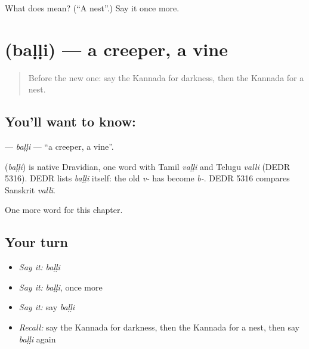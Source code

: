 \begin{tcolorbox}[breakable,colback=teal!4,colframe=teal!35!black,title={Before you move on}]
What does  mean? (\textquotedblleft{}A nest\textquotedblright{}.) Say it once more.
\end{tcolorbox}
\section[\texorpdfstring{\kn{ಬಳ್ಳಿ} (baḷḷi)}{ಬಳ್ಳಿ (baḷḷi)}]{ (baḷḷi) — a creeper, a vine}

\label{lesson:KA-C188-balli}



\begin{quote}
Before the new one: say the Kannada for darkness, then the Kannada for a nest.
\end{quote}

\subsection*{You'll want to know: }
\textbf{} — \emph{baḷḷi} — \textquotedblleft{}a creeper, a vine\textquotedblright{}.

\begin{cousinweb}
\textbf{} (\emph{baḷḷi}) is native Dravidian, one word with Tamil \emph{vaḷḷi} and Telugu \emph{valli} (DEDR 5316). DEDR lists \emph{baḷḷi} itself: the old \emph{v-} has become \emph{b-}. DEDR 5316 compares Sanskrit \emph{vallī}.
\end{cousinweb}

\begin{grammarlens}[title={What you've built}]
One more word for this chapter.
\end{grammarlens}

\subsection*{Your turn}
\begin{itemize}
\raggedright
  \item \emph{Say it:} \emph{baḷḷi}
  \item \emph{Say it:} \emph{baḷḷi}, once more
  \item \emph{Say it:} say \emph{baḷḷi}
  \item \emph{Recall:} say the Kannada for darkness, then the Kannada for a nest, then say \emph{baḷḷi} again
\end{itemize}

